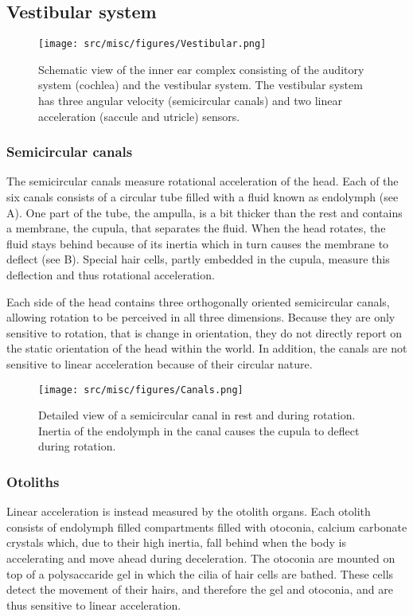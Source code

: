 \subsection{Vestibular system}

\begin{figure}
    \texttt{[image: src/misc/figures/Vestibular.png]}
    \caption{Schematic view of the inner ear complex consisting of the auditory system (cochlea) and the vestibular system. The vestibular system has three angular velocity (semicircular canals) and two linear acceleration (saccule and utricle) sensors.}
    \label{intro:fig6}
\end{figure}


\subsubsection{Semicircular canals}
The semicircular canals measure rotational acceleration of the head. Each of the six  canals consists of a circular tube filled with a fluid known as endolymph (see A). One part of the tube, the ampulla, is a bit thicker than the rest and contains a membrane, the cupula, that separates the fluid. When the head rotates, the fluid stays behind because of its inertia which in turn causes the membrane to deflect (see B). Special hair cells, partly embedded in the cupula, measure this deflection and thus rotational acceleration. 

Each side of the head contains three orthogonally oriented semicircular canals, allowing rotation to be perceived in all three dimensions. Because they are only sensitive to rotation, that is change in orientation, they do not directly report on the static orientation of the head within the world. In addition, the canals are not sensitive to linear acceleration because of their circular nature.

\begin{figure}
    \texttt{[image: src/misc/figures/Canals.png]}
    \caption{Detailed view of a semicircular canal  in rest and  during rotation. Inertia of the endolymph in the canal causes the cupula to deflect during rotation.}
    \label{intro:fig3}
\end{figure}


\subsubsection{Otoliths}
Linear acceleration is instead measured by the otolith organs. Each otolith consists of endolymph filled compartments filled with otoconia, calcium carbonate crystals which, due to their high inertia, fall behind when the body is accelerating and move ahead during deceleration. The otoconia are mounted on top of a polysaccaride gel in which the cilia of hair cells are bathed. These cells detect the movement of their hairs, and therefore the gel and otoconia, and are thus sensitive to linear acceleration.

